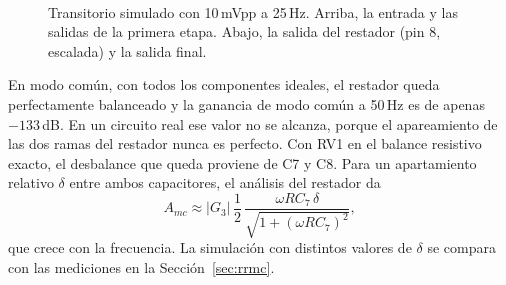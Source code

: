 \documentclass[journal,a4paper]{IEEEtran}
\begin{document}
\begin{figure}[!t]
\centering
{}\\[-2pt]
\caption{Transitorio simulado con 10\,mVpp a 25\,Hz. Arriba, la entrada y las salidas de la primera etapa. Abajo, la salida del restador (pin 8, escalada) y la salida final.}
\label{fig:tran}
\end{figure}

En modo común, con todos los componentes ideales, el restador queda perfectamente balanceado y la ganancia de modo común a 50\,Hz es de apenas $-133$\,dB. En un circuito real ese valor no se alcanza, porque el apareamiento de las dos ramas del restador nunca es perfecto. Con RV1 en el balance resistivo exacto, el desbalance que queda proviene de C7 y C8. Para un apartamiento relativo $\delta$ entre ambos capacitores, el análisis del restador da
\begin{equation}
A_{mc} \approx |G_3|\,\frac{1}{2}\,\frac{\omega R C_7\,\delta}{\sqrt{1+(\omega R C_7)^2}},
\end{equation}
que crece con la frecuencia. La simulación con distintos valores de $\delta$ se compara con las mediciones en la Sección~\ref{sec:rrmc}.
\end{document}
